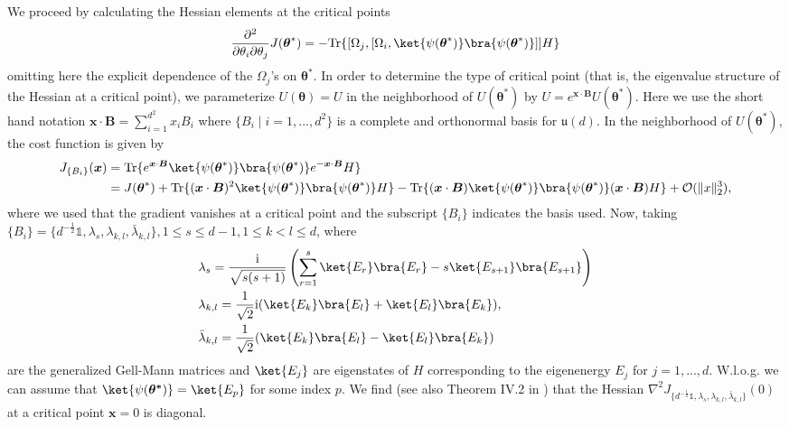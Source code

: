 \documentclass{article}
\renewcommand{\vec}[1]{\ensuremath{\boldsymbol{#1}}}
\begin{document}
We proceed by calculating the Hessian elements at the critical points
\begin{equation}
    \frac{\partial^2}{\partial \theta_i \partial \theta_j} J(\vec{\theta}^*) = - \mathrm{Tr}\{[\Omega_j, [\Omega_i, \ket{\psi(\vec{\theta}^*)} \bra{\psi(\vec{\theta}^*)}]] H\}
\end{equation}
omitting here the explicit dependence of the \(\Omega_j\)'s on \(\vec{\theta}^*\).
In order to determine the type of critical point (that is, the eigenvalue structure of the Hessian at a critical point), we parameterize \(U(\vec{\theta}) = U\) in the neighborhood of \(U(\vec{\theta}^*)\) by \(U = e^{\vec{x} \cdot \vec{B}} U(\vec{\theta}^*)\). Here we use the short hand notation \(\vec{x} \cdot \vec{B} = \sum_{i=1}^{d^2} x_i B_i\) where \(\{B_i \mid i=1,...,d^2\}\) is a complete and orthonormal basis for \(\mathfrak{u}(d)\). In the neighborhood of \(U(\vec{\theta}^*)\), the cost function is given by
\begin{align}
    J_{\{B_i\}}(\vec{x}) &= \mathrm{Tr}\{e^{\vec{x} \cdot \vec{B}} \ket{\psi(\vec{\theta}^*)}\bra{\psi(\vec{\theta}^*)}e^{-\vec{x}\cdot\vec{B}}H\} \\
    & = J(\vec{\theta}^*) + \mathrm{Tr}\{(\vec{x}\cdot\vec{B})^2\ket{\psi(\vec{\theta}^*)}\bra{\psi(\vec{\theta}^*)} H\} -\mathrm{Tr}\{(\vec{x}\cdot\vec{B})\ket{\psi(\vec{\theta}^*)}\bra{\psi(\vec{\theta}^*)}(\vec{x}\cdot\vec{B})H\} + \mathcal{O}(\lVert x \rVert_2^3), \nonumber
\end{align}
where we used that the gradient vanishes at a critical point and the subscript \(\{B_i\}\) indicates the basis used. Now, taking \(\{B_i\} = \{d^{-\frac{1}{2}}\mathds{1},\lambda_s, \lambda_{k,l}, \bar{\lambda}_{k,l}\}, 1 \leq s \leq d-1, 1 \leq k < l \leq d\), where
\begin{align}
    &\lambda_s = \frac{\mathrm{i}}{\sqrt{s(s+1)}}\left(\sum_{r=1}^s \ket{E_r}\bra{E_r} -s\ket{E_{s+1}}\bra{E_{s+1}}\right) \\
    & \lambda_{k,l} = \frac{1}{\sqrt{2}} \mathrm{i}(\ket{E_k}\bra{E_l} + \ket{E_l}\bra{E_k}), \\
    & \bar{\lambda}_{k, l} = \frac{1}{\sqrt{2}}(\ket{E_k}\bra{E_l} - \ket{E_l}\bra{E_k})
\end{align}
are the generalized Gell-Mann matrices and \(\ket{E_j}\) are eigenstates of \(H\) corresponding to the eigenenergy \(E_j\) for \(j=1,...,d\). W.l.o.g. we can assume that \(\ket{\psi(\vec{\theta^*})} = \ket{E_p}\) for some index \(p\).
We find (see also Theorem IV.2 in \cite{wang_analysis_2010}) that the Hessian \(\nabla^2J_{\{d^{-\frac{1}{2}}\mathds{1},\lambda_s,\lambda_{k,l}, \bar{\lambda}_{k,l}\}}(0)\) at a critical point \(\vec{x}=0\) is diagonal.
\end{document}
